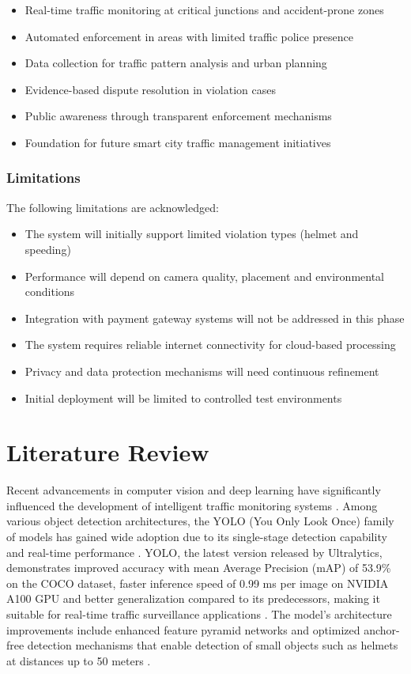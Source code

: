 \documentclass[12pt, a4paper, oneside]{memoir}
\begin{document}
\begin{itemize}
    \item Real-time traffic monitoring at critical junctions and accident-prone zones
    \item Automated enforcement in areas with limited traffic police presence
    \item Data collection for traffic pattern analysis and urban planning
    \item Evidence-based dispute resolution in violation cases
    \item Public awareness through transparent enforcement mechanisms
    \item Foundation for future smart city traffic management initiatives
\end{itemize}

\newpage
\subsection{Limitations}
The following limitations are acknowledged:

\begin{itemize}
    \item The system will initially support limited violation types (helmet and speeding)
    \item Performance will depend on camera quality, placement and environmental conditions
    \item Integration with payment gateway systems will not be addressed in this phase
    \item The system requires reliable internet connectivity for cloud-based processing
    \item Privacy and data protection mechanisms will need continuous refinement
    \item Initial deployment will be limited to controlled test environments
\end{itemize}

\chapter{Literature Review}

Recent advancements in computer vision and deep learning have significantly influenced the development of intelligent traffic monitoring systems \cite{sushma2025traffic}. Among various object detection architectures, the YOLO (You Only Look Once) family of models has gained wide adoption due to its single-stage detection capability and real-time performance \cite{ultralytics2025yolo}. YOLO, the latest version released by Ultralytics, demonstrates improved accuracy with mean Average Precision (mAP) of 53.9\% on the COCO dataset, faster inference speed of 0.99 ms per image on NVIDIA A100 GPU and better generalization compared to its predecessors, making it suitable for real-time traffic surveillance applications \cite{jetir2023}. The model's architecture improvements include enhanced feature pyramid networks and optimized anchor-free detection mechanisms that enable detection of small objects such as helmets at distances up to 50 meters \cite{ultralytics2025yolo}.
\end{document}
